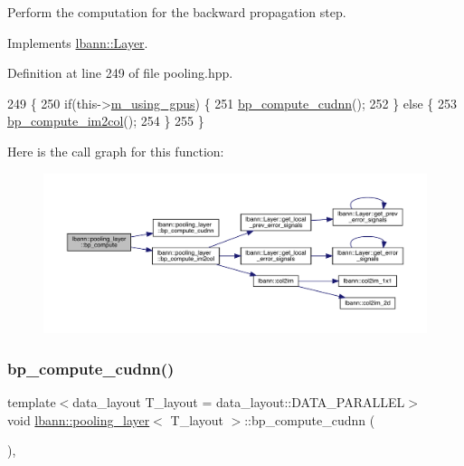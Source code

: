 Perform the computation for the backward propagation step. 

Implements \hyperlink{classlbann_1_1Layer_a7442e01f9ee1294df2de811efcf5171e}{lbann\+::\+Layer}.



Definition at line 249 of file pooling.\+hpp.


\begin{DoxyCode}
249                              \{
250     \textcolor{keywordflow}{if}(this->\hyperlink{classlbann_1_1Layer_af7881cb5eff5207c15fa835d65462e8f}{m\_using\_gpus}) \{
251       \hyperlink{classlbann_1_1pooling__layer_a457b52475f27ab55985f1e47515e7c3b}{bp\_compute\_cudnn}();
252     \} \textcolor{keywordflow}{else} \{
253       \hyperlink{classlbann_1_1pooling__layer_a704aca0e1e5bba7d27b7755133e6d50b}{bp\_compute\_im2col}();
254     \}
255   \}
\end{DoxyCode}
Here is the call graph for this function\+:\nopagebreak
\begin{figure}[H]
\begin{center}
\leavevmode
\includegraphics[width=350pt]{classlbann_1_1pooling__layer_ab58fe97e976f60df37f958e79fd56ff9_cgraph}
\end{center}
\end{figure}
\mbox{\label{classlbann_1_1pooling__layer_a457b52475f27ab55985f1e47515e7c3b}} 
\subsubsection{\texorpdfstring{bp\+\_\+compute\+\_\+cudnn()}{bp\_compute\_cudnn()}}
{\footnotesize\ttfamily template$<$data\+\_\+layout T\+\_\+layout = data\+\_\+layout\+::\+D\+A\+T\+A\+\_\+\+P\+A\+R\+A\+L\+L\+EL$>$ \\
void \hyperlink{classlbann_1_1pooling__layer}{lbann\+::pooling\+\_\+layer}$<$ T\+\_\+layout $>$\+::bp\+\_\+compute\+\_\+cudnn (\begin{DoxyParamCaption}{ }\end{DoxyParamCaption})\hspace{0.3cm}{\ttfamily [inline]}, {\ttfamily [private]}}



